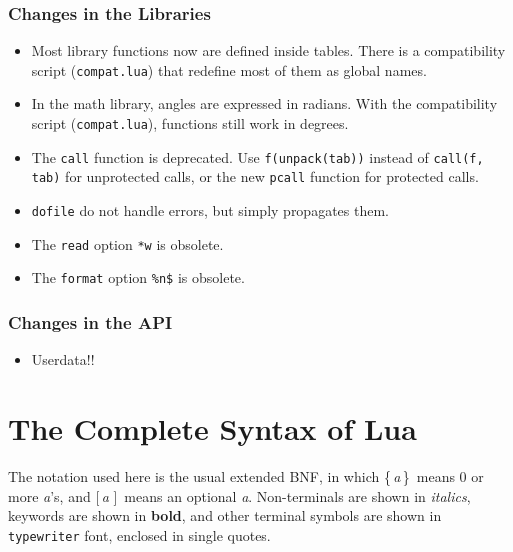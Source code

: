 \documentclass[11pt,twoside]{article}
\renewcommand{\rep}[1]{{\rm\{}\,#1\,{\rm\}}}
\renewcommand{\opt}[1]{{\rm [}\,#1\,{\,\rm]}}
\begin{document}
\subsubsection*{Changes in the Libraries}
\begin{itemize}

\item
Most library functions now are defined inside tables.
There is a compatibility script (\verb|compat.lua|) that
redefine most of them as global names.

\item
In the math library, angles are expressed in radians.
With the compatibility script (\verb|compat.lua|),
functions still work in degrees.

\item
The \verb|call| function is deprecated.
Use \verb|f(unpack(tab))| instead of \verb|call(f, tab)|
for unprotected calls,
or the new \verb|pcall| function for protected calls.

\item
\verb|dofile| do not handle errors, but simply propagates them.

\item
The \verb|read| option \verb|*w| is obsolete.

\item
The \verb|format| option \verb|%n$| is obsolete.

\end{itemize}


\subsubsection*{Changes in the API}
\begin{itemize}

\item
Userdata!!

\end{itemize}

\newpage
\section*{The Complete Syntax of Lua} \label{BNF}

The notation used here is the usual extended BNF,
in which
\rep{\emph{a}}~means 0 or more \emph{a}'s, and
\opt{\emph{a}}~means an optional \emph{a}.
Non-terminals are shown in \emph{italics},
keywords are shown in {\bf bold},
and other terminal symbols are shown in {\tt typewriter} font,
enclosed in single quotes.
\end{document}
